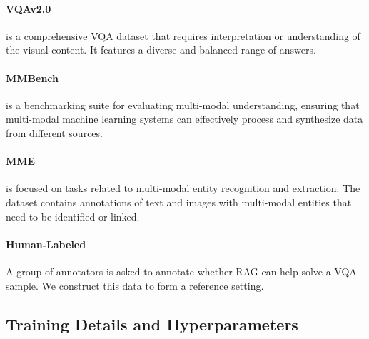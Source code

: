\paragraph{VQAv2.0} is a comprehensive VQA dataset that requires interpretation or understanding of the visual content. It features a diverse and balanced range of answers.

\paragraph{MMBench} is a benchmarking suite for evaluating multi-modal understanding, ensuring that multi-modal machine learning systems can effectively process and synthesize data from different sources.

\paragraph{MME} is focused on tasks related to multi-modal entity recognition and extraction. The dataset contains annotations of text and images with multi-modal entities that need to be identified or linked.

\paragraph{Human-Labeled} A group of annotators is asked to annotate whether RAG can help solve a VQA sample. We construct this data to form a reference setting. 



\subsection{Training Details and Hyperparameters}
\label{hyper_appendix_section}


\begin{table}[tb]
\centering
\small
{}
\caption{Detailed hyperparameters.}
\label{hyper_table}
\end{table}


